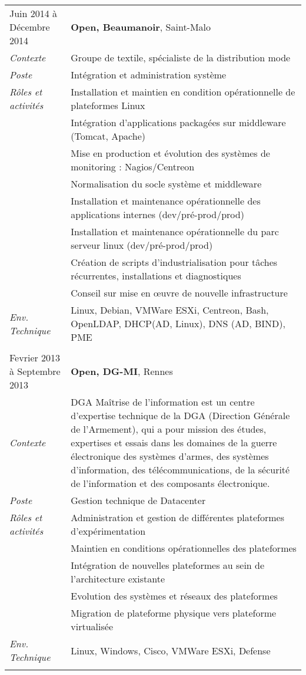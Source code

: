 \documentclass[a4paper,8pt]{article}
\begin{document}
\begin{tabular}{P{3.5cm}|p{13cm}}
Juin 2014 à Décembre 2014	& \textbf{Open, Beaumanoir}, Saint-Malo\\
\textsl{Contexte}			& Groupe de textile, spécialiste de la distribution mode\\
\textsl{Poste}				& Intégration et administration système\\
\textsl{Rôles et activités}	& Installation et maintien en condition opérationnelle de plateformes Linux\\
							& Intégration d'applications packagées sur middleware (Tomcat, Apache)\\
							& Mise en production et évolution des systèmes de monitoring : Nagios/Centreon\\
							& Normalisation du socle système et middleware\\
							& Installation et maintenance opérationnelle des applications internes (dev/pré-prod/prod)\\
							& Installation et maintenance opérationnelle du parc serveur linux (dev/pré-prod/prod)\\
							& Création de scripts d'industrialisation pour tâches récurrentes, installations et diagnostiques\\
							& Conseil sur mise en œuvre de nouvelle infrastructure\\
\textsl{Env. Technique}		& Linux, Debian, VMWare ESXi, Centreon, Bash, OpenLDAP, DHCP(AD, Linux), DNS (AD, BIND), PME\\
 & \\

Fevrier 2013 à Septembre 2013	& \textbf{Open, DG-MI}, Rennes\\
\textsl{Contexte}      		& DGA Maîtrise de l'information est un centre d'expertise technique de la DGA (Direction Générale de l'Armement), qui a pour mission des études, expertises et essais dans les domaines de la guerre électronique des systèmes d'armes, des systèmes d'information, des télécommunications, de la sécurité de l'information et des composants électronique.\\
\textsl{Poste}				& Gestion technique de Datacenter\\
\textsl{Rôles et activités}	& Administration et gestion de différentes plateformes d'expérimentation\\
							& Maintien en conditions opérationnelles des plateformes\\
							& Intégration de nouvelles plateformes au sein de l'architecture existante\\
							& Evolution des systèmes et réseaux des plateformes\\
							& Migration de plateforme physique vers plateforme virtualisée\\
\textsl{Env. Technique}		& Linux, Windows, Cisco, VMWare ESXi, Defense\\
 & \\


\end{tabular}
\end{document}
